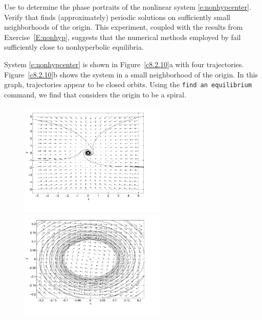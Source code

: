 \documentclass{ximera}
\begin{document}
\begin{computerExercise} \label{c8.2.10}
Use {\pplane} to determine the phase portraits of the nonlinear system
\eqref{e:nonhypcenter}.  Verify that {\pplane} finds (approximately) 
periodic solutions on sufficiently small neighborhoods of the origin.  This 
experiment, coupled with the results from Exercise~\ref{E:nonhyp}, suggests 
that the numerical methods employed by {\pplane} fail sufficiently close 
to nonhyperbolic equilibria.

\begin{solution}

System \eqref{e:nonhypcenter} is shown in Figure~\ref{c8.2.10}a with four
trajectories.  Figure~\ref{c8.2.10}b shows the system in a small
neighborhood of the origin.  In this graph, trajectories appear to be
closed orbits.  Using the {\tt find an equilibrium} command, we find
that \Matlab considers the origin to be a spiral.

\begin{figure}[htb]
                       \centerline{%
                       \includegraphics[width=2.75in]{exfigure/8-2-10a.pdf}
                       \includegraphics[width=2.75in]{exfigure/8-2-10b.pdf}}
\end{figure}

\end{solution}
\end{computerExercise}
\end{document}
